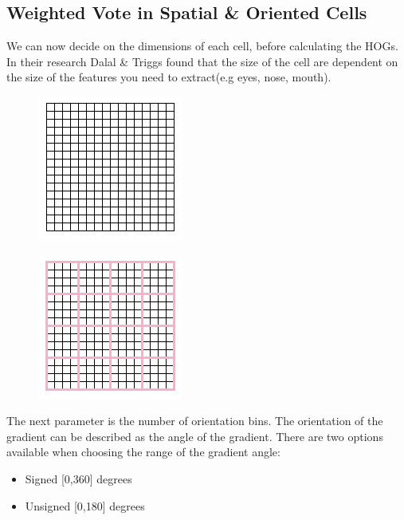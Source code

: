 \subsection{Weighted Vote in Spatial \& Oriented Cells}
We can now decide on the dimensions of each cell, before calculating the HOGs. In their research Dalal \& Triggs found that the size of the cell are dependent on the size of the features you need to extract(e.g eyes, nose, mouth). 
\begin{figure}[H]
\centering
\begin{minipage}{.5\textwidth}
  \centering
  \includegraphics[width=.4\linewidth]{pixels}
  \label{fig:test1}
\end{minipage}%
\begin{minipage}{.5\textwidth}
  \centering
  \includegraphics[width=.4\linewidth]{cells}
  \label{fig:test2}
\end{minipage}
\end{figure}
The next parameter is the number of orientation bins. The orientation of the gradient can be described as the angle of the gradient. There are two options available when choosing the range of the gradient angle:
\begin{itemize}
  \item Signed [0,360] degrees
  \item Unsigned [0,180] degrees
\end{itemize}
